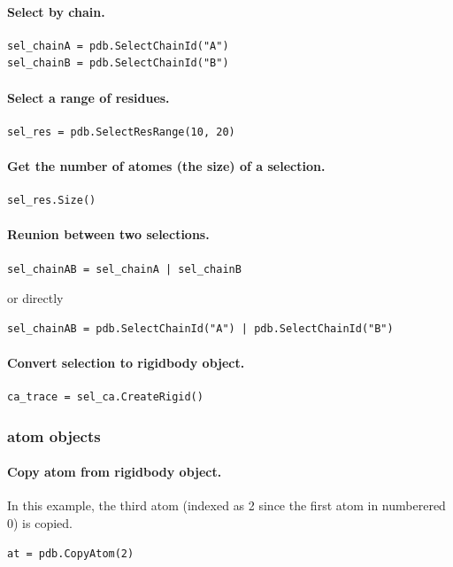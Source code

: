\documentclass[12pt,a4paper]{article}
\begin{document}
\paragraph{Select by chain.}
\begin{verbatim}
sel_chainA = pdb.SelectChainId("A")
sel_chainB = pdb.SelectChainId("B")
\end{verbatim}


\paragraph{Select a range of residues.}
\begin{verbatim}
sel_res = pdb.SelectResRange(10, 20)
\end{verbatim}


\paragraph{Get the number of atomes (the size) of a selection.}
\begin{verbatim}
sel_res.Size()
\end{verbatim}



\paragraph{Reunion between two selections.}
\begin{verbatim}
sel_chainAB = sel_chainA | sel_chainB
\end{verbatim}
or directly
\begin{verbatim}
sel_chainAB = pdb.SelectChainId("A") | pdb.SelectChainId("B")
\end{verbatim}


\paragraph{Convert selection to rigidbody object.}
\begin{verbatim}
ca_trace = sel_ca.CreateRigid()
\end{verbatim}

\subsubsection{atom objects}

\paragraph{Copy atom from rigidbody object.} In this example, the third atom (indexed as 2 since the first atom in numberered 0) is copied.
\begin{verbatim}
at = pdb.CopyAtom(2)
\end{verbatim}
\end{document}

